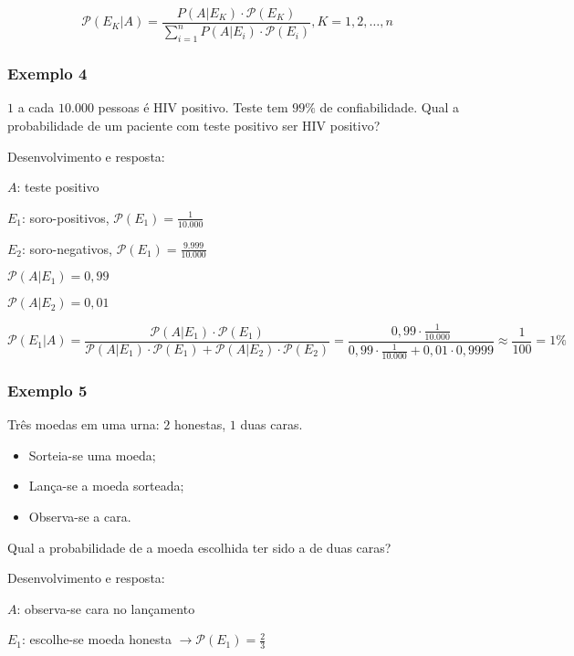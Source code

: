 \documentclass[a4paper]{article}
\newcommand{\nota}[2][]{\todo[color=yellow!30,linecolor=black, #1]{#2}}
\begin{document}
	\begin{equation*}
	\mathcal{P}(E_{K} | A) = \dfrac{P(A | E_{K}) \cdot \mathcal{P}(E_{K})}{\sum_{i=1}^{n}P(A | E_{i}) \cdot \mathcal{P}(E_{i})}, K = 1, 2, \dots, n
	\end{equation*}
	
	\subsubsection{Exemplo 4}
	
	\noindent $1$ a cada $10.000$ pessoas é HIV positivo. Teste tem $99\%$ de confiabilidade. Qual a probabilidade de um paciente com teste positivo ser HIV positivo?
	
	Desenvolvimento e resposta:
	
	$A$: teste positivo
	
	$E_{1}$: soro-positivos, $\mathcal{P}(E_{1}) = \frac{1}{10.000}$
	
	$E_{2}$: soro-negativos, $\mathcal{P}(E_{1}) = \frac{9.999}{10.000}$
	
	$\mathcal{P}(A|E_{1}) = 0,99$
	
	$\mathcal{P}(A|E_{2}) = 0,01$
	
	$\mathcal{P}(E_{1}|A) = \dfrac{\mathcal{P}(A|E_{1}) \cdot \mathcal{P}(E_{1})}{\mathcal{P}(A|E_{1}) \cdot \mathcal{P}(E_{1}) + \mathcal{P}(A | E_{2}) \cdot \mathcal{P}(E_{2})} = \dfrac{0,99 \cdot \frac{1}{10.000}}{0,99 \cdot \frac{1}{10.000} + 0,01 \cdot 0,9999} \approx \dfrac{1}{100} = 1\%$
	
	\subsubsection{Exemplo 5}
	
	\noindent Três moedas em uma urna: $2$ honestas, $1$ duas caras.
	
	\begin{itemize}
		\item Sorteia-se uma moeda;
		\item Lança-se a moeda sorteada;
		\item Observa-se a cara.
	\end{itemize}
	
	\marginpar
	\noindent \nota{$\mathcal{P}(E_{2} | A) = ?$}Qual a probabilidade de a moeda escolhida ter sido a de duas caras?
	
	Desenvolvimento e resposta:
	
	$A$: observa-se cara no lançamento
	
	$E_{1}$: escolhe-se moeda honesta $\rightarrow \mathcal{P}(E_{1}) = \frac{2}{3}$
	
\end{document}
